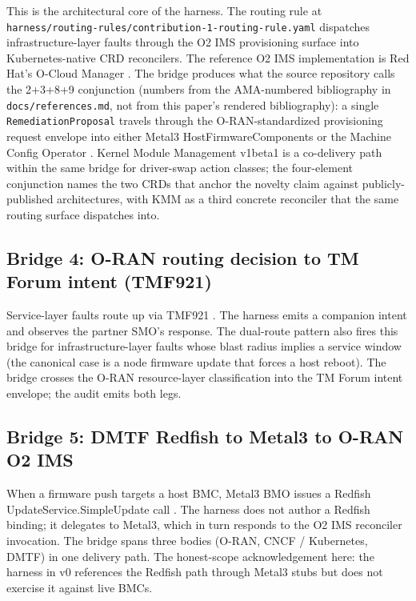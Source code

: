 \documentclass[twocolumn,10pt,a4paper]{article}
\begin{document}
This is the architectural core of the harness. The routing rule at \texttt{harness/routing-rules/contribution-1-routing-rule.yaml} dispatches infrastructure-layer faults through the O2 IMS provisioning surface \cite{oran_o2_ganp,oran_o2_ims} into Kubernetes-native CRD reconcilers. The reference O2 IMS implementation is Red Hat's O-Cloud Manager \cite{oran_o2ims_ocm}. The bridge produces what the source repository calls the 2+3+8+9 conjunction (numbers from the AMA-numbered bibliography in \texttt{docs/references.md}, not from this paper's rendered bibliography): a single \texttt{RemediationProposal} travels through the O-RAN-standardized provisioning request envelope into either Metal3 HostFirmwareComponents \cite{metal3_bmo} or the Machine Config Operator \cite{openshift_mco}. Kernel Module Management v1beta1 \cite{kmm_operator} is a co-delivery path within the same bridge for driver-swap action classes; the four-element conjunction names the two CRDs that anchor the novelty claim against publicly-published architectures, with KMM as a third concrete reconciler that the same routing surface dispatches into.

\subsection{Bridge 4: O-RAN routing decision to TM Forum intent (TMF921)}

Service-layer faults route up via TMF921 \cite{tmf921}. The harness emits a companion intent and observes the partner SMO's response. The dual-route pattern also fires this bridge for infrastructure-layer faults whose blast radius implies a service window (the canonical case is a node firmware update that forces a host reboot). The bridge crosses the O-RAN resource-layer classification into the TM Forum intent envelope; the audit emits both legs.

\subsection{Bridge 5: DMTF Redfish to Metal3 to O-RAN O2 IMS}

When a firmware push targets a host BMC, Metal3 BMO \cite{metal3_bmo} issues a Redfish UpdateService.SimpleUpdate call \cite{dmtf_redfish}. The harness does not author a Redfish binding; it delegates to Metal3, which in turn responds to the O2 IMS reconciler invocation. The bridge spans three bodies (O-RAN, CNCF / Kubernetes, DMTF) in one delivery path. The honest-scope acknowledgement here: the harness in v0 references the Redfish path through Metal3 stubs but does not exercise it against live BMCs.
\end{document}
